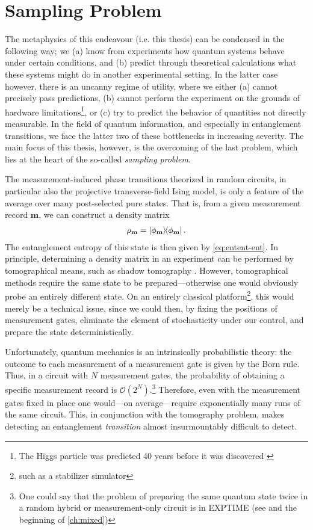 \clearpage
\section{Sampling Problem}\label{sec:sampling}

The metaphysics of this endeavour (i.e. this thesis) can be condensed in the
following way; we (a) know from experiments how quantum systems behave under
certain conditions, and (b) predict through theoretical calculations what these
systems might do in another experimental setting. In the latter case however,
there is an uncanny regime of utility, where we either (a) cannot precisely
pass predictions, (b) cannot perform the experiment on the grounds of
hardware limitations\footnote{The Higgs particle was predicted 40 years before
it was discovered \cite{nobelprize.orgNobelPrizePhysics2013}}, or (c) try to
predict the behavior of quantities not directly measurable. In the field of
quantum information, and especially in entanglement transitions, we face the
latter two of these bottlenecks in increasing severity. The main focus of this
thesis, however, is the overcoming of the last problem, which lies at the heart of the
so-called \emph{sampling problem}.

The measurement-induced phase transitions theorized in random circuits, in
particular also the projective transverse-field Ising model, is only a feature
of the average over many post-selected pure states. That is, from a given
measurement record $\mathbf{m}$, we can construct a density matrix
\begin{align} \rho_\mathbf{m} = \dyad{\phi_\mathbf{m}} .\end{align} The
entanglement entropy of this state is then given by \cref{eq:entent-ent}.  In
principle, determining a density matrix in an experiment can be performed by
tomographical means, such as shadow tomography
\cite{aaronsonShadowTomographyQuantum2018}.  However, tomographical methods
require the same state to be prepared---otherwise one would obviously probe an
entirely different state.  On an entirely classical platform\footnote{such as a
stabilizer simulator}, this would merely be a technical issue, since we could
then, by fixing the positions of measurement gates, eliminate the
element of stochasticity under our control, and prepare the state
deterministically. 

Unfortunately, quantum mechanics is an intrinsically probabilistic theory: the
outcome to each measurement of a measurement gate is given by the Born rule.
Thus, in a circuit with $N$ measurement gates, the probability of obtaining a
specific measurement record is $\mathcal{O}\left(2^N\right)$.\footnote{One
could say that the problem of preparing the same quantum state twice in a
random hybrid or measurement-only circuit is in \textsf{EXPTIME} (see
\cite{ComplexityZoo} and the beginning of \cref{ch:mixed})} 
Therefore, even with the measurement gates fixed in place one would---on
average---require exponentially many runs of the same circuit. This, in conjunction
with the tomography problem, makes detecting an entanglement \emph{transition}
almost insurmountably difficult to detect.

